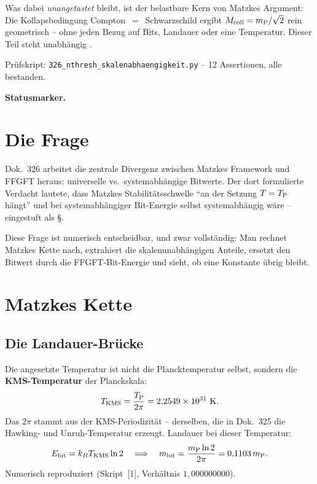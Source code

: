 Was dabei \emph{unangetastet} bleibt, ist der belastbare Kern von Matzkes
Argument: Die Kollapsbedingung Compton~$=$~Schwarzschild ergibt
$M_{\mathrm{coll}} = m_{\mathrm{P}}/\sqrt{2}$ rein geometrisch -- ohne jeden Bezug auf Bits,
Landauer oder eine Temperatur. Dieser Teil steht unabhängig \B.

Prüfskript: \texttt{326\_nthresh\_skalenabhaengigkeit.py} --
12 Assertionen, alle bestanden.

\medskip\noindent\textbf{Statusmarker.}


\section{Die Frage}

Dok.~326 arbeitet die zentrale Divergenz zwischen Matzkes Framework und
FFGFT heraus: universelle vs.\ systemabhängige Bitwerte.
Der dort formulierte Verdacht lautete, dass Matzkes Stabilitätsschwelle
\enquote{an der Setzung $T = T_{\mathrm{P}}$ hängt} und bei systemabhängiger
Bit-Energie selbst systemabhängig wäre -- eingestuft als \S.

Diese Frage ist numerisch entscheidbar, und zwar vollständig:
Man rechnet Matzkes Kette nach, extrahiert die skalenunabhängigen
Anteile, ersetzt den Bitwert durch die FFGFT-Bit-Energie und sieht,
ob eine Konstante übrig bleibt.

\section{Matzkes Kette}

\subsection{Die Landauer-Brücke}

Die angesetzte Temperatur ist nicht die Plancktemperatur selbst,
sondern die \textbf{KMS-Temperatur} der Planckskala:
\begin{equation}
  T_{\mathrm{KMS}} = \frac{T_{\mathrm{P}}}{2\pi} = 2{,}2549\times10^{31}~\mathrm{K}.
\end{equation}
Das $2\pi$ stammt aus der KMS-Periodizität -- derselben, die in
Dok.~325 die Hawking- und Unruh-Temperatur erzeugt.
Landauer bei dieser Temperatur:
\begin{equation}
  E_{\mathrm{bit}} = k_B T_{\mathrm{KMS}} \ln 2
  \quad\Longrightarrow\quad
  m_{\mathrm{bit}} = \frac{m_{\mathrm{P}} \ln 2}{2\pi} = 0{,}1103\,m_{\mathrm{P}} .
\end{equation}
Numerisch reproduziert (Skript~[1], Verhältnis $1{,}000000000$). \B

